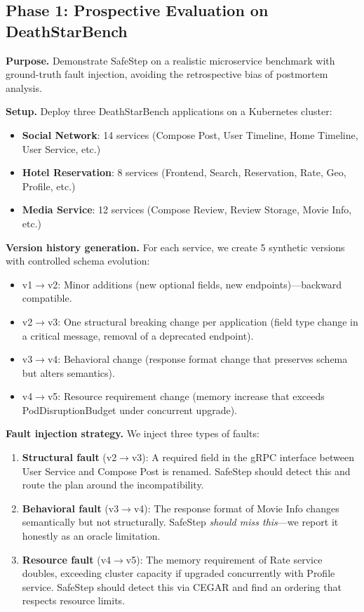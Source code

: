 \documentclass[10pt,twocolumn]{article}
\begin{document}
\subsection{Phase 1: Prospective Evaluation on DeathStarBench}
\label{sec:eval-prospective}

\textbf{Purpose.} Demonstrate SafeStep on a realistic microservice benchmark with ground-truth fault injection, avoiding the retrospective bias of postmortem analysis.

\textbf{Setup.} Deploy three DeathStarBench applications on a Kubernetes cluster:
\begin{itemize}
\item \textbf{Social Network}: 14 services (Compose Post, User Timeline, Home Timeline, User Service, etc.)
\item \textbf{Hotel Reservation}: 8 services (Frontend, Search, Reservation, Rate, Geo, Profile, etc.)
\item \textbf{Media Service}: 12 services (Compose Review, Review Storage, Movie Info, etc.)
\end{itemize}

\textbf{Version history generation.} For each service, we create 5 synthetic versions with controlled schema evolution:
\begin{itemize}
\item v1$\to$v2: Minor additions (new optional fields, new endpoints)---backward compatible.
\item v2$\to$v3: One structural breaking change per application (field type change in a critical message, removal of a deprecated endpoint).
\item v3$\to$v4: Behavioral change (response format change that preserves schema but alters semantics).
\item v4$\to$v5: Resource requirement change (memory increase that exceeds PodDisruptionBudget under concurrent upgrade).
\end{itemize}

\textbf{Fault injection strategy.} We inject three types of faults:
\begin{enumerate}
\item \textbf{Structural fault} (v2$\to$v3): A required field in the gRPC interface between User Service and Compose Post is renamed. SafeStep should detect this and route the plan around the incompatibility.
\item \textbf{Behavioral fault} (v3$\to$v4): The response format of Movie Info changes semantically but not structurally. SafeStep \emph{should miss this}---we report it honestly as an oracle limitation.
\item \textbf{Resource fault} (v4$\to$v5): The memory requirement of Rate service doubles, exceeding cluster capacity if upgraded concurrently with Profile service. SafeStep should detect this via CEGAR and find an ordering that respects resource limits.
\end{enumerate}
\end{document}
